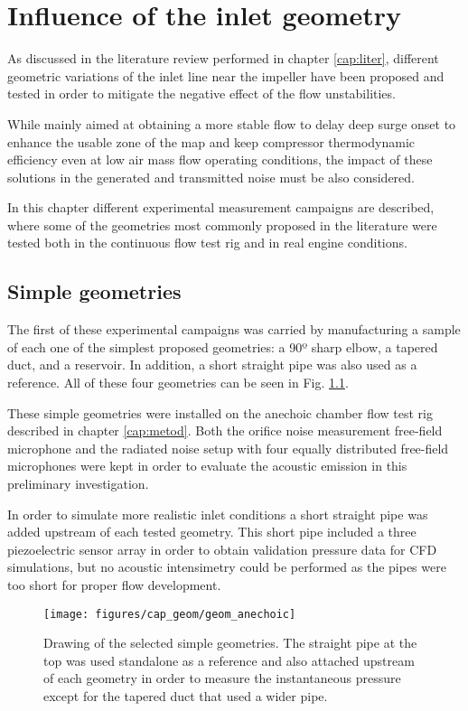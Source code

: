 \chapter{Influence of the inlet geometry} 
\label{cap:geom}

As discussed in the literature review performed in chapter \ref{cap:liter}, different geometric variations of the inlet line near the impeller have been proposed and tested in order to mitigate the negative effect of the flow unstabilities.

While mainly aimed at obtaining a more stable flow to delay deep surge onset to enhance the usable zone of the map and keep compressor thermodynamic efficiency even at low air mass flow operating conditions, the impact of these solutions in the generated and transmitted noise must be also considered.

In this chapter different experimental measurement campaigns are described, where some of the geometries most commonly proposed in the literature were tested both in the continuous flow test rig and in real engine conditions. 

\section{Simple geometries}
\label{sec:geom_simple}

The first of these experimental campaigns was carried by manufacturing a sample of each one of the simplest proposed geometries: a 90º sharp elbow, a tapered duct, and a reservoir. In addition, a short straight pipe was also used as a reference. All of these four geometries can be seen in Fig. \ref{fig:image_simple_geom}.

These simple geometries were installed on the anechoic chamber flow test rig described in chapter \ref{cap:metod}. Both the orifice noise measurement free-field microphone and the radiated noise setup with four equally distributed free-field microphones were kept in order to evaluate the acoustic emission in this preliminary investigation.

In order to simulate more realistic inlet conditions a short straight pipe was added upstream of each tested geometry. This short pipe included a three piezoelectric sensor array in order to obtain  validation pressure data for CFD simulations, but no acoustic intensimetry could be performed as the pipes were too short for proper flow development.

\begin{figure}[tb!]
\centering
\texttt{[image: figures/cap\_geom/geom\_anechoic]}
\caption[Drawing of the selected simple geometries]{Drawing of the selected simple geometries. The straight pipe at the top was used standalone as a reference and also attached upstream of each geometry in order to measure the instantaneous pressure except for the tapered duct that used a wider pipe.}
\label{fig:image_simple_geom}
\end{figure}

